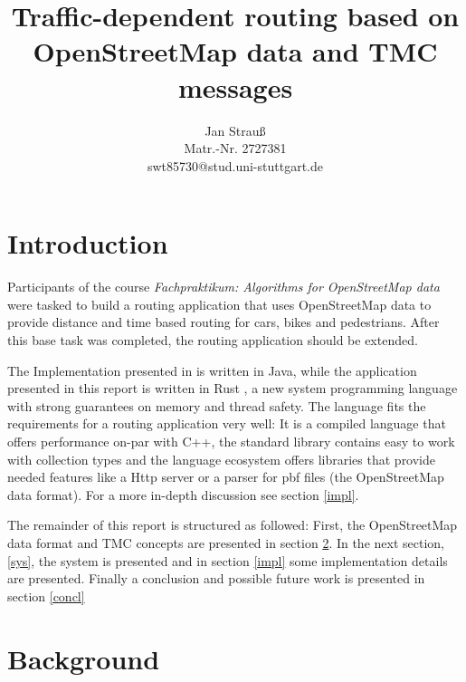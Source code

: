 \documentclass[a4paper]{scrartcl}
\title{Traffic-dependent routing based on OpenStreetMap data and TMC messages}
\author{
  Jan Strauß\\
  Matr.-Nr. 2727381\\
  swt85730@stud.uni-stuttgart.de
}
\date{}
\begin{document}
\maketitle


\section{Introduction}
Participants of the course \textit{Fachpraktikum: Algorithms for OpenStreetMap data} were tasked to build a routing application that uses OpenStreetMap \cite{osm_main} data to provide distance and time based routing for cars, bikes and pedestrians. After this base task was completed, the routing application should be extended. 

The Implementation presented in \cite{sanwald2013} is written in Java, while the application presented in this report is written in Rust \cite{rust_main}, a new system programming language with strong guarantees on memory and thread safety. The language fits the requirements for a routing application very well: It is a compiled language that offers performance on-par with C++, the standard library contains easy to work with collection types and the language ecosystem offers libraries that provide needed features like a Http server or a parser for pbf files (the OpenStreetMap data format). For a more in-depth discussion see section \ref{impl}.

The remainder of this report is structured as followed: First, the OpenStreetMap data format and TMC concepts are presented in section \ref{bg}. In the next section, \ref{sys}, the system is presented and in section \ref{impl} some implementation details are presented. Finally a conclusion and possible future work is presented in section \ref{concl}

\section{Background}
\label{bg}
\end{document}
